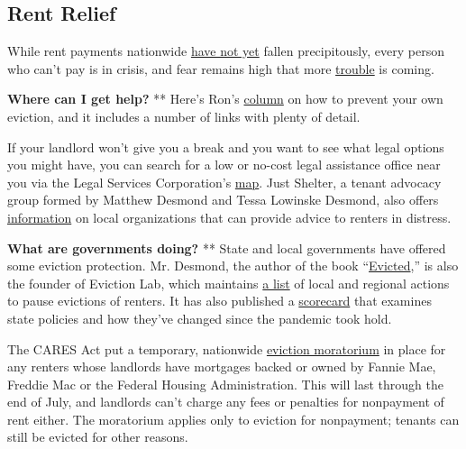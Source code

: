 \hypertarget{rent-relief}{%
\subsection{Rent Relief}\label{rent-relief}}

While rent payments nationwide
\href{https://www.nytimes3xbfgragh.onion/2020/05/31/business/economy/coronavirus-rent-landlords-tenants.html}{have
not yet} fallen precipitously, every person who can't pay is in crisis,
and fear remains high that more
\href{https://www.nytimes3xbfgragh.onion/2020/05/27/us/coronavirus-evictions-renters.html?action=click\&module=RelatedLinks\&pgtype=Article}{trouble}
is coming.

\textbf{Where can I get help?} ** Here's Ron's
\href{https://www.nytimes3xbfgragh.onion/2020/07/11/your-money/coronavirus-eviction-prevention-renters-landlord.html}{column}
on how to prevent your own eviction, and it includes a number of links
with plenty of detail.

If your landlord won't give you a break and you want to see what legal
options you might have, you can search for a low or no-cost legal
assistance office near you via the Legal Services Corporation's
\href{https://www.lsc.gov/what-legal-aid/find-legal-aid}{map}. Just
Shelter, a tenant advocacy group formed by Matthew Desmond and Tessa
Lowinske Desmond, also offers
\href{https://justshelter.org/community-resources/}{information} on
local organizations that can provide advice to renters in distress.

\textbf{What are governments doing?} ** State and local governments have
offered some eviction protection. Mr. Desmond, the author of the book
``\href{https://www.nytimes3xbfgragh.onion/2016/02/28/books/review/matthew-desmonds-evicted-poverty-and-profit-in-the-american-city.html}{Evicted},''
is also the founder of Eviction Lab, which maintains
\href{https://evictionlab.org/covid-eviction-policies/}{a list} of local
and regional actions to pause evictions of renters. It has also
published a
\href{https://evictionlab.org/covid-policy-scorecard/}{scorecard} that
examines state policies and how they've changed since the pandemic took
hold.

The CARES Act put a temporary, nationwide
\href{https://crsreports.congress.gov/product/pdf/IN/IN11320}{eviction
moratorium} in place for any renters whose landlords have mortgages
backed or owned by Fannie Mae, Freddie Mac or the Federal Housing
Administration. This will last through the end of July, and landlords
can't charge any fees or penalties for nonpayment of rent either. The
moratorium applies only to eviction for nonpayment; tenants can still be
evicted for other reasons.

